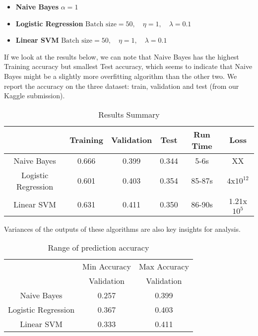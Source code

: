 \documentclass[11pt]{article}
\begin{document}
\begin{itemize}
	\item \textbf{Naive Bayes} $\alpha = 1$
	\item \textbf{Logistic Regression} $\text{Batch size} = 50,\quad \eta = 1, \quad \lambda = 0.1$
	\item \textbf{Linear SVM} $\text{Batch size} = 50,\quad \eta = 1, \quad \lambda = 0.1$\\
\end{itemize}

If we look at the results below, we can note that Naive Bayes has the highest Training accuracy but smallest Test accuracy, which seems to indicate that Naive Bayes might be a slightly more overfitting algorithm than the other two. We report the accuracy on the three dataset: train, validation and test (from our Kaggle submission).\\

\begin{table}[h!]
\centering
\caption{Results Summary}
\label{Results Summary}
\begin{tabular}{c|c|c|c|c|c|}
\cline{2-6}
\multicolumn{1}{l|}{}                     & Training & Validation & Test  & Run Time & Loss                      \\ \hline
\multicolumn{1}{|c|}{Naive Bayes}         & 0.666    & 0.399      & 0.344 & 5-6s     &    XX                       \\ \cline{1-1}
\multicolumn{1}{|c|}{Logistic Regression} & 0.601    & 0.403      & 0.354 & 85-87s   & $4$x$10^{12}$   \\ \cline{1-1}
\multicolumn{1}{|c|}{Linear SVM}          & 0.631    & 0.411      & 0.350 & 86-90s   & $1.21$x$10^5$ \\ \hline
\end{tabular}
\end{table}

Variances of the outputs of these algorithms are also key insights for analysis.\\

\begin{table}[h!]
\centering
\caption{Range of prediction accuracy}
\label{my-label}
\begin{tabular}{c|c|c|}
\cline{2-3}
\multicolumn{1}{l|}{}                     & Min Accuracy & Max Accuracy \\ \cline{2-3} 
\multicolumn{1}{l|}{}                     & Validation   & Validation   \\ \hline
\multicolumn{1}{|c|}{Naive Bayes}         & 0.257        & 0.399        \\ \hline
\multicolumn{1}{|c|}{Logistic Regression} & 0.367        & 0.403        \\ \hline
\multicolumn{1}{|c|}{Linear SVM}          & 0.333        & 0.411        \\ \hline
\end{tabular}
\end{table}
\end{document}
